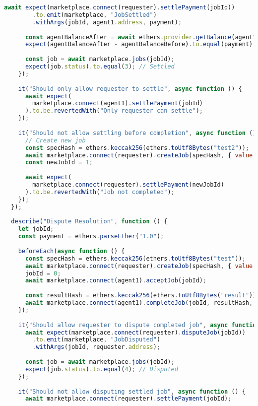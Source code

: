 \begin{lstlisting}[language=JavaScript,caption={Complete test suite for smart contracts}]
      await expect(marketplace.connect(requester).settlePayment(jobId))
        .to.emit(marketplace, "JobSettled")
        .withArgs(jobId, agent1.address, payment);
      
      const agentBalanceAfter = await ethers.provider.getBalance(agent1.address);
      expect(agentBalanceAfter - agentBalanceBefore).to.equal(payment);
      
      const job = await marketplace.jobs(jobId);
      expect(job.status).to.equal(3); // Settled
    });
    
    it("Should only allow requester to settle", async function () {
      await expect(
        marketplace.connect(agent1).settlePayment(jobId)
      ).to.be.revertedWith("Only requester can settle");
    });
    
    it("Should not allow settling before completion", async function () {
      // Create new job
      const specHash = ethers.keccak256(ethers.toUtf8Bytes("test2"));
      await marketplace.connect(requester).createJob(specHash, { value: payment });
      const newJobId = 1;
      
      await expect(
        marketplace.connect(requester).settlePayment(newJobId)
      ).to.be.revertedWith("Job not completed");
    });
  });
  
  describe("Dispute Resolution", function () {
    let jobId;
    const payment = ethers.parseEther("1.0");
    
    beforeEach(async function () {
      const specHash = ethers.keccak256(ethers.toUtf8Bytes("test"));
      await marketplace.connect(requester).createJob(specHash, { value: payment });
      jobId = 0;
      await marketplace.connect(agent1).acceptJob(jobId);
      
      const resultHash = ethers.keccak256(ethers.toUtf8Bytes("result"));
      await marketplace.connect(agent1).completeJob(jobId, resultHash, "ipfs");
    });
    
    it("Should allow requester to dispute completed job", async function () {
      await expect(marketplace.connect(requester).disputeJob(jobId))
        .to.emit(marketplace, "JobDisputed")
        .withArgs(jobId, requester.address);
      
      const job = await marketplace.jobs(jobId);
      expect(job.status).to.equal(4); // Disputed
    });
    
    it("Should not allow disputing settled job", async function () {
      await marketplace.connect(requester).settlePayment(jobId);
      

\end{lstlisting}
